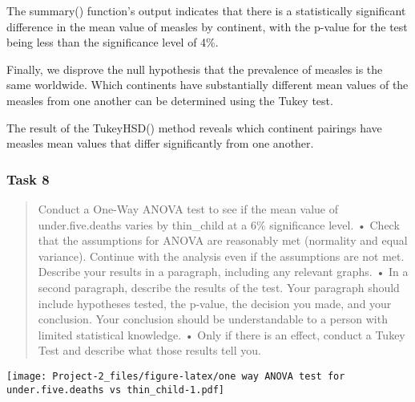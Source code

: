 \documentclass[
]{article}
\newenvironment{Shaded}{\begin{snugshade}}{\end{snugshade}}
\newcommand{\AttributeTok}[1]{\textcolor[rgb]{0.77,0.63,0.00}{#1}}
\newcommand{\FunctionTok}[1]{\textcolor[rgb]{0.00,0.00,0.00}{#1}}
\newcommand{\NormalTok}[1]{#1}
\newcommand{\SpecialCharTok}[1]{\textcolor[rgb]{0.00,0.00,0.00}{#1}}
\newcommand{\StringTok}[1]{\textcolor[rgb]{0.31,0.60,0.02}{#1}}
\begin{document}
The summary() function's output indicates that there is a statistically
significant difference in the mean value of measles by continent, with
the p-value for the test being less than the significance level of 4\%.

Finally, we disprove the null hypothesis that the prevalence of measles
is the same worldwide. Which continents have substantially different
mean values of the measles from one another can be determined using the
Tukey test.

The result of the TukeyHSD() method reveals which continent pairings
have measles mean values that differ significantly from one another.

\hypertarget{task-8}{%
\subsubsection{Task 8}\label{task-8}}

\begin{quote}
Conduct a One-Way ANOVA test to see if the mean value of
under.five.deaths varies by thin\_child at a 6\% significance level. •
Check that the assumptions for ANOVA are reasonably met (normality and
equal variance). Continue with the analysis even if the assumptions are
not met. Describe your results in a paragraph, including any relevant
graphs. • In a second paragraph, describe the results of the test. Your
paragraph should include hypotheses tested, the p-value, the decision
you made, and your conclusion. Your conclusion should be understandable
to a person with limited statistical knowledge. • Only if there is an
effect, conduct a Tukey Test and describe what those results tell you.
\end{quote}

\begin{Shaded}
\end{Shaded}

\texttt{[image: Project-2\_files/figure-latex/one way ANOVA test for under.five.deaths vs thin\_child-1.pdf]}
\end{document}
